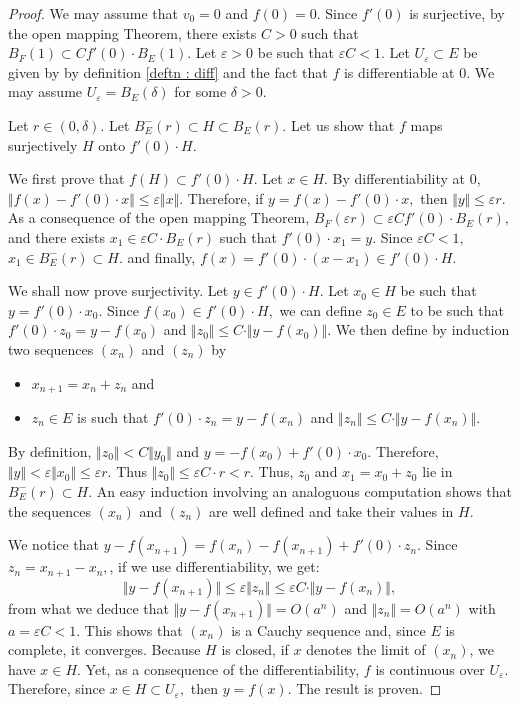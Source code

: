 \documentclass{lms}
\begin{document}
\begin{proof}
We may assume that $v_0=0$ and $f(0)=0$. Since $f'(0)$ is surjective, by 
the open mapping Theorem, there exists $C>0$ such that $B_F(1) \subset 
C  f'(0) \cdot B_E(1)$. Let $\varepsilon>0$ be such that 
$\varepsilon C < 1$. Let $U_\varepsilon \subset E$ be given by by definition \ref{deftn : diff} and the fact that $f$ is differentiable at $0$. We may assume $U_\varepsilon = 
B_E(\delta)$ for some $\delta >0$.

Let $r \in (0, \delta)$. Let $B^-_E(r) \subset H \subset
B_E(r).$
Let us show that $f$ maps surjectively $H$ onto $f'(0) \cdot H$.

We first prove that $f(H) \subset f'(0) \cdot H$.
Let $x \in H$. By differentiability at $0$, $\Vert f(x)-f'(0) \cdot x \Vert \leq 
\varepsilon \Vert x \Vert $. Therefore, if $y=f(x)-f'(0) \cdot x,$ then $\Vert y \Vert \leq \varepsilon r$. As a consequence of the open mapping Theorem, $B_F(\varepsilon r) \subset 
\varepsilon C  f'(0) \cdot B_E(r),$ and there exists $x_1 \in \varepsilon C  \cdot B_E(r)$ such that $f'(0) \cdot x_1 =y.$ Since $\varepsilon C <1,$  $x_1 \in B^-_E(r) \subset H.$ and finally, $f(x)= f'(0) \cdot (x-x_1) \in f'(0) \cdot H$.

We shall now prove surjectivity. Let $y \in f'(0) \cdot H$. 
Let $x_0 \in H$ be such that $y = f'(0) \cdot x_0$. Since $f(x_0) \in f'(0) \cdot H,$ we can define $z_0 \in E$ to be such that $f'(0) \cdot z_0 = y - f(x_0)$ and $\Vert z_0 \Vert \leq C \cdot \Vert y - f(x_0) \Vert$.
We then define by induction two sequences $(x_n)$ and $(z_n)$ by
\begin{itemize}
\item $x_{n+1}=x_n+z_n$ and 
\item $z_n \in E$ is such that
$f'(0) \cdot z_n = y - f(x_n)$ and
$\Vert z_n \Vert \leq C \cdot \Vert y - f(x_n) \Vert$.
\end{itemize}
By definition, $\Vert z_0 \Vert < C \Vert y_0\Vert$ and $y 
= -f(x_0)+f'(0) \cdot x_0$. Therefore, $\Vert y \Vert < \varepsilon 
\Vert x_0 \Vert \leq \varepsilon r$. Thus $\Vert z_0 \Vert \leq 
\varepsilon C \cdot r < r$. Thus, $z_0$ and $x_1=x_0+z_0$  lie in $B^-_E(r) 
\subset H$. An easy induction involving an analoguous computation
shows that the sequences $(x_n)$ and $(z_n)$ are well defined and
take their values in $H$.

We notice that $y - f(x_{n+1}) = f(x_n) - f(x_{n+1}) + f'(0) \cdot z_n$.
Since $z_n=x_{n+1}-x_n,$, if we use differentiability, we get:
$$\Vert y  - f(x_{n+1}) \Vert 
\leq \varepsilon \Vert z_n \Vert \leq \varepsilon C \cdot \Vert 
y - f(x_n) \Vert,$$
from what we deduce that $\Vert y - f(x_{n+1}) \Vert = 
O(a^n)$ and $\Vert z_n \Vert = O(a^n)$ with $a = \varepsilon C < 1$.
This shows that $(x_n)$ is a Cauchy sequence and, since $E$ is complete, it converges. Because $H$ is closed, if $x$ denotes the limit of $(x_n)$, we have $x \in H.$ Yet, as a consequence of the differentiability, $f$ is continuous over $U_\varepsilon.$ Therefore, since $x \in H \subset U_\varepsilon,$ then  $y=f(x)$. The result is proven.
\end{proof}
\end{document}
